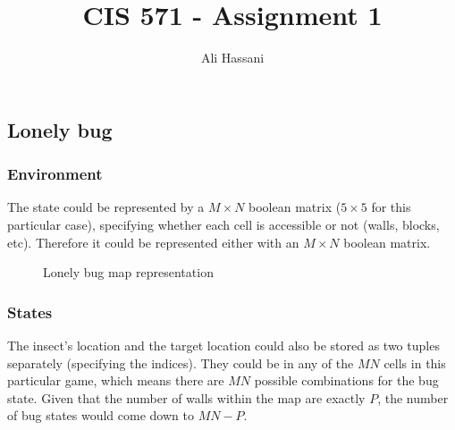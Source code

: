 \documentclass{homework}
\title{CIS 571 - Assignment 1}
\author{Ali Hassani}
\begin{document}
\maketitle

\renewcommand{\theenumi}{\alph{enumi}}
\renewcommand{\theenumii}{\roman{enumii}}

\exercise[1]
\subsection{Lonely bug}

\subsubsection{Environment}
The state could be represented by a $M \times N$ boolean matrix ($5 \times 5$ for this particular case), specifying whether each cell is accessible or not (walls, blocks, etc).
Therefore it could be represented either with an $M \times N$ boolean matrix.

\begin{figure}[h!]
    \centering
    \qquad
    \caption{Lonely bug map representation}
    \label{fig:lonelybug11}
\end{figure}

\subsubsection{States}
The insect's location and the target location could also be stored as two tuples separately (specifying the indices). They could be in any of the $MN$ cells in this particular game, which means there are $MN$ possible combinations for the bug state. Given that the number of walls within the map are exactly $P$, the number of bug states would come down to $MN - P$.
\end{document}
